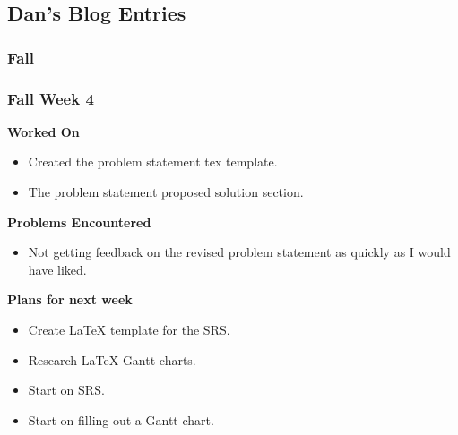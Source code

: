 \documentclass[compsoc,draftclsnofoot,onecolumn,10pt]{IEEEtran}
\begin{document}
\subsection{Dan's Blog Entries}

\subsubsection{Fall}
\subsubsection*{Fall Week 4}
\textbf{Worked On}
\begin{itemize}
    \item Created the problem statement tex template.
    \item The problem statement proposed solution section.
\end{itemize}
\textbf{Problems Encountered}
\begin{itemize}
    \item Not getting feedback on the revised problem statement as quickly as I would have liked.
\end{itemize}
\textbf{Plans for next week}
\begin{itemize}
    \item Create LaTeX template for the SRS.
    \item Research LaTeX Gantt charts.
    \item Start on SRS.
    \item Start on filling out a Gantt chart.
\end{itemize}
\end{document}
